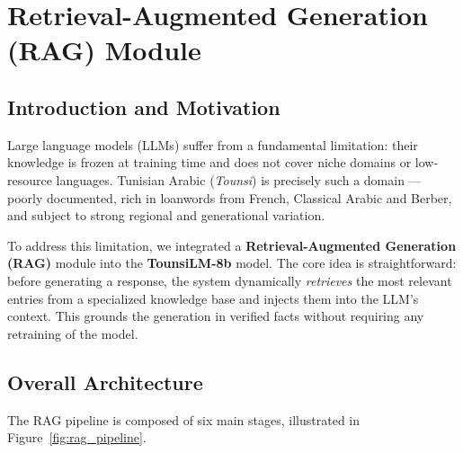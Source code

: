 %    

\section{Retrieval-Augmented Generation (RAG) Module}
\label{sec:rag}

\subsection{Introduction and Motivation}

Large language models (LLMs) suffer from a fundamental limitation: their knowledge is
frozen at training time and does not cover niche domains or low-resource languages.
Tunisian Arabic (\textit{Tounsi}) is precisely such a domain — poorly documented,
rich in loanwords from French, Classical Arabic and Berber, and subject to strong
regional and generational variation.

To address this limitation, we integrated a \textbf{Retrieval-Augmented Generation (RAG)}
module into the \textbf{TounsiLM-8b} model. The core idea is straightforward: before
generating a response, the system dynamically \textit{retrieves} the most relevant
entries from a specialized knowledge base and injects them into the LLM's context.
This grounds the generation in verified facts without requiring any retraining of the model.

\subsection{Overall Architecture}
\label{subsec:architecture}

The RAG pipeline is composed of six main stages, illustrated in
Figure~\ref{fig:rag_pipeline}.

